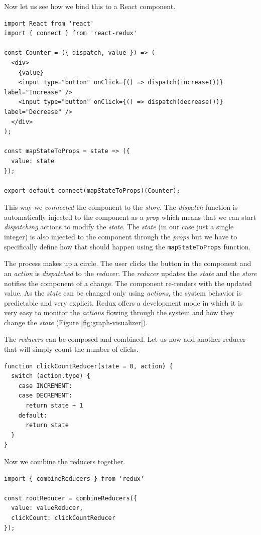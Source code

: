 Now let us see how we bind this to a React component.

\begin{verbatim}
import React from 'react'
import { connect } from 'react-redux'

const Counter = ({ dispatch, value }) => (
  <div>
    {value}
    <input type="button" onClick={() => dispatch(increase())} label="Increase" />
    <input type="button" onClick={() => dispatch(decrease())} label="Decrease" />
  </div>
);

const mapStateToProps = state => ({
  value: state
});

export default connect(mapStateToProps)(Counter);
\end{verbatim}

This way we \emph{connected} the component to the \emph{store}. The \emph{dispatch} function is automatically injected to the component as a \emph{prop} which means that we can start \emph{dispatching} actions to modify the \emph{state}. The \emph{state} (in our case just a single integer) is also injected to the component through the \emph{props} but we have to specifically define how that should happen using the \texttt{mapStateToProps} function.

The process makes up a circle. The user clicks the button in the component and an \emph{action} is \emph{dispatched} to the \emph{reducer}. The \emph{reducer} updates the \emph{state} and the \emph{store} notifies the component of a change. The component re-renders with the updated value. As the \emph{state} can be changed only using \emph{actions}, the system behavior is predictable and very explicit. Redux offers a development mode in which it is very easy to monitor the \emph{actions} flowing through the system and how they change the \emph{state} (Figure \ref{fig:graph-visualizer}).

The \emph{reducers} can be composed and combined. Let us now add another reducer that will simply count the number of clicks.

\begin{verbatim}
function clickCountReducer(state = 0, action) {
  switch (action.type) {
    case INCREMENT:
    case DECREMENT:
      return state + 1
    default:
      return state
  }
}
\end{verbatim}

Now we combine the reducers together.

\begin{verbatim}
import { combineReducers } from 'redux'

const rootReducer = combineReducers({
  value: valueReducer,
  clickCount: clickCountReducer
});
\end{verbatim}

